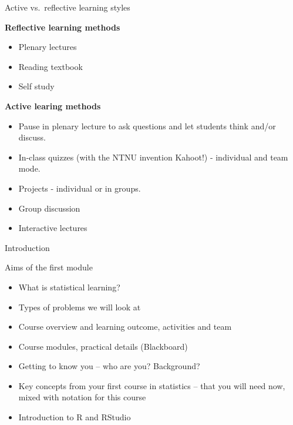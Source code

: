 \documentclass[10pt,ignorenonframetext,]{beamer}
\providecommand{\tightlist}{%
  \setlength{\itemsep}{0pt}\setlength{\parskip}{0pt}}
\begin{document}
\begin{frame}

\begin{block}{Active vs.~reflective learning styles}

\vspace{2mm}

\textbf{Reflective learning methods}

\begin{itemize}
\tightlist
\item
  Plenary lectures
\item
  Reading textbook
\item
  Self study
\end{itemize}

\vspace{4mm}

\textbf{Active learing methods}

\begin{itemize}
\tightlist
\item
  Pause in plenary lecture to ask questions and let students think
  and/or discuss.
\item
  In-class quizzes (with the NTNU invention Kahoot!) - individual and
  team mode.
\item
  Projects - individual or in groups.
\item
  Group discussion
\item
  Interactive lectures
\end{itemize}

\end{block}

\end{frame}

\begin{frame}{Introduction}

\begin{block}{Aims of the first module}

\begin{itemize}
\item
  What is statistical learning?
\item
  Types of problems we will look at
\item
  Course overview and learning outcome, activities and team
\item
  Course modules, practical details (Blackboard)
\item
  Getting to know you -- who are you? Background?
\item
  Key concepts from your first course in statistics -- that you will
  need now, mixed with notation for this course
\item
  Introduction to R and RStudio\\
\end{itemize}

\end{block}

\end{frame}
\end{document}

